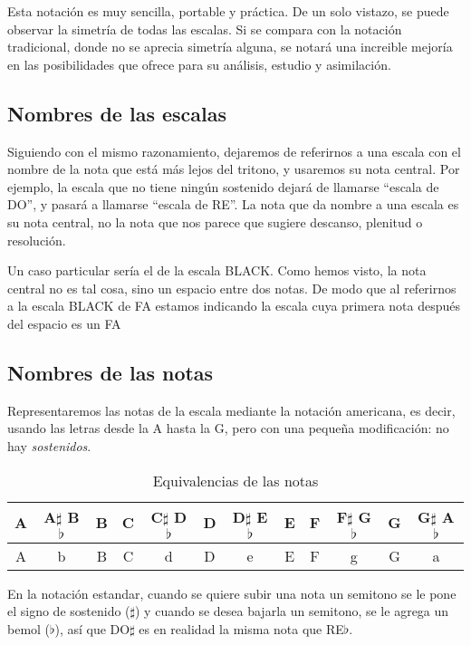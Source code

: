 \documentclass[]{article}
\begin{document}
Esta notación es muy sencilla, portable y práctica. De un solo vistazo, se puede observar la simetría de todas las escalas. Si se compara con la notación tradicional, donde no se aprecia simetría alguna, se notará una increible mejoría en las posibilidades que ofrece para su análisis, estudio y asimilación.

\subsection{Nombres de las escalas}
Siguiendo con el mismo razonamiento, dejaremos de referirnos a una escala con el nombre de la nota que está más lejos del tritono, y usaremos su nota central. Por ejemplo, la escala que no tiene ningún sostenido dejará de llamarse ``escala de DO'', y pasará a llamarse ``escala de RE''. La nota que da nombre a una escala es su nota central, no la nota que nos parece que sugiere descanso, plenitud o resolución.

Un caso particular sería el de la escala \textsf{BLACK}. Como hemos visto, la nota central no es tal cosa, sino un espacio entre dos notas. De modo que al referirnos a la escala \textsf{BLACK} de FA estamos indicando la escala cuya primera nota después del espacio es un FA

\subsection{Nombres de las notas}

Representaremos las notas de la escala mediante la notación americana, es decir, usando las letras desde la A hasta la G, pero con una pequeña modificación: no hay \emph{sostenidos}.

\begin{table}[htbp]
  \centering
  \begingroup
  \sffamily
  \begin{tabular}{*{12}{c}}
    \toprule    
    A & A$\sharp$ B$\flat$ & B & C & C$\sharp$ D$\flat$ & D & D$\sharp$ E$\flat$ & E & F & F$\sharp$ G$\flat$ & G & G$\sharp$ A$\flat$ \\
    \midrule    
    A & b & B & C & d & D & e & E & F & g & G & a \\    
    \bottomrule
  \end{tabular}
  \endgroup
  \caption{Equivalencias de las notas}\label{tab:note-equivalences}
\end{table}

En la notación estandar, cuando se quiere subir una nota un semitono se le pone el signo de sostenido ($\sharp$) y cuando se desea bajarla un semitono, se le agrega un bemol ($\flat$), así que DO$\sharp$ es en realidad la misma nota que RE$\flat$.
\end{document}
